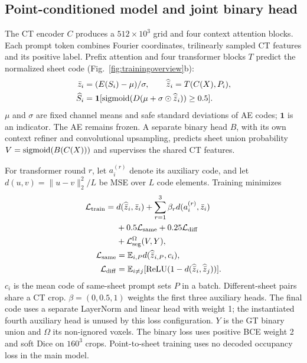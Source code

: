 \subsection{Point-conditioned model and joint binary head}
The CT encoder $C$ produces a $512\times10^3$ grid and four context attention
blocks. Each prompt token combines Fourier coordinates, trilinearly sampled
CT features and its positive label. Prefix attention and four transformer
blocks $T$ predict the normalized sheet code (Fig.~\ref{fig:trainingoverview}b):
\begin{align}
 \bar z_i&=(E(S_i)-\mu)/\sigma,\qquad
 \widehat{\bar z}_i=T(C(X),P_i),\nonumber\\
 \widehat S_i&=\mathbf1[\operatorname{sigmoid}(D(\mu+\sigma\odot\widehat{\bar z}_i))\ge0.5].
 \label{eq:p2sd}
\end{align}
$\mu$ and $\sigma$ are fixed channel means and safe standard deviations of AE
codes; $\mathbf1$ is an indicator. The AE remains frozen. A separate binary
head $B$, with its own context refiner and convolutional upsampling, predicts sheet union probability
$V=\operatorname{sigmoid}(B(C(X)))$ and supervises the shared CT features.

For transformer round $r$, let $a_i^{(r)}$ denote its auxiliary code, and
let $d(u,v)=\|u-v\|_2^2/L$ be MSE over $L$ code elements. Training minimizes
\begin{align}
 \mathcal L_{\rm train}={}&d(\widehat{\bar z}_i,\bar z_i)
 +\sum_{r=1}^{3}\beta_r d(a_i^{(r)},\bar z_i)\nonumber\\
 &+0.5\mathcal L_{\rm same}+0.25\mathcal L_{\rm diff}\nonumber\\
 &+\mathcal L_{\rm seg}^{\Omega}(V,Y),\label{eq:p2sdloss}\\
 \mathcal L_{\rm same}&=\mathbb E_{i,P}d(\widehat{\bar z}_{i,P},c_i),\nonumber\\
 \mathcal L_{\rm diff}&=\mathbb E_{i\ne j}[\operatorname{ReLU}(1-d(
 \widehat{\bar z}_i,\widehat{\bar z}_j))].\nonumber
\end{align}
$c_i$ is the mean code of same-sheet prompt sets $P$ in a batch. Different-sheet
pairs share a CT crop. $\beta=(0,0.5,1)$ weights the first three auxiliary
heads. The final code uses a separate LayerNorm and linear head with weight 1;
the instantiated fourth auxiliary head is unused by this loss configuration.
$Y$ is the
GT binary union and $\Omega$ its non-ignored voxels. The binary loss uses
positive BCE weight 2 and soft Dice on $160^3$ crops. Point-to-sheet training
uses no decoded occupancy loss in the main model.
